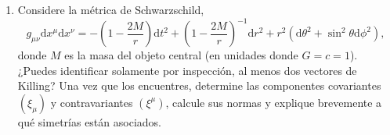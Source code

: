 \documentclass[../main]{subfiles}
\begin{document}
\begin{adjustwidth}{0pt}{-100pt}
\begin{enumerate}
\begin{enumerate}[label=(\alph*)]
        \item Considere la métrica de Schwarzschild, 
        \begin{equation}
            g_{\mu\nu}\mathrm{d}x^{\mu}\mathrm{d}x^{\nu}=-\left(1-\dfrac{2M}{r}\right)\mathrm{d}t^2+\left(1-\dfrac{2M}{r}\right)^{-1}\mathrm{d}r^2+r^2(\mathrm{d}\theta^2+\sin^2 \theta \mathrm{d}\phi^2),
        \end{equation}
        donde $M$ es la masa del objeto central (en unidades donde $G=c=1$). ¿Puedes identificar solamente por inspección, al menos dos vectores de Killing? Una vez que los encuentres, determine las componentes covariantes $(\xi_{\mu})$ y contravariantes $(\xi^{\mu})$, calcule sus normas y explique brevemente a qué simetrías están asociados.
    \end{enumerate}
\end{enumerate}
\end{adjustwidth}
\end{document}

